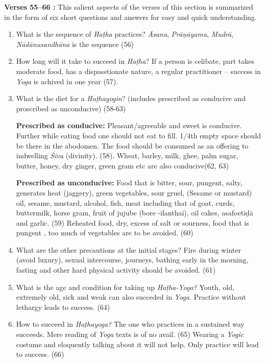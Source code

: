 \textbf{Verses 55--66 :} This salient aspects of the verses of this section is summarized in the form of six short questions and answers for easy and quick understanding.

\begin{enumerate}
\item What is the sequence of \textit{Haṭha} practices?  \textit{Āsana}, \textit{Prāṇāyama}, \textit{Mudrā}, \textit{Nādānusandhāna} is the sequence (56)
\item How long will it take to succeed in \textit{Haṭha}? If a person is celibate, part takes moderate food, has a dispasstionate nature, a regular practitioner – success in \textit{Yoga} is achived in one year (57).
\item What is the diet for a \textit{Haṭhayogin}? (includes prescribed as conducive and proscribed as unconducive) (58-63)   

\textbf{Prescribed as conducive:} Pleasant/agreeable and sweet is conducive. Further while eating food  one should not eat to fill. 1/4th  empty space should be there in the abodomen. The food should be consumed as an offering to indwelling \textit{Śiva} (divinity). (58). Wheat, barley, milk, ghee, palm sugar, butter, honey, dry ginger, green gram etc  are also conducive(62, 63)

\vspace{-5pt}
\textbf{Prescribed as unconducive:} Food that is bitter, sour, pungent, salty, generates heat (jaggery), green vegetables, sour gruel, (Sesame or mustard) oil, sesame, mustard, alcohol, fish, meat including that of goat, curds, buttermilk, horse gram, fruit of jujube (bore -ilanthai), oil cakes, asafoetiḍā and garlic. (59) Reheated food, dry, excess of salt or sourness, food that is pungent , too much of vegetables are to be avoided. (60)
\vspace{-7pt}
\item What are the other precautions at the initial stages?    Fire during winter (avoid luxury), sexual intercourse, journeys, bathing early in the morning, fasting and other hard physical activity should be avoided. (61)  
\vspace{-7pt}
\item What is the age and condition for taking up \textit{Haṭha-Yoga?} Youth, old, extremely old, sick and weak can also succeded in \textit{Yoga}. Practice without lethargy leads to success. (64)
\vspace{-7pt}
\item How to succeed in \textit{Haṭhayoga?} The one who practices in a sustained way succeeds. Mere reading of \textit{Yoga} texts is of no avail. (65) Wearing a \textit{Yogic} costume and eloquently talking about it will not help. Only practice will lead to success. (66) 
\end{enumerate}

